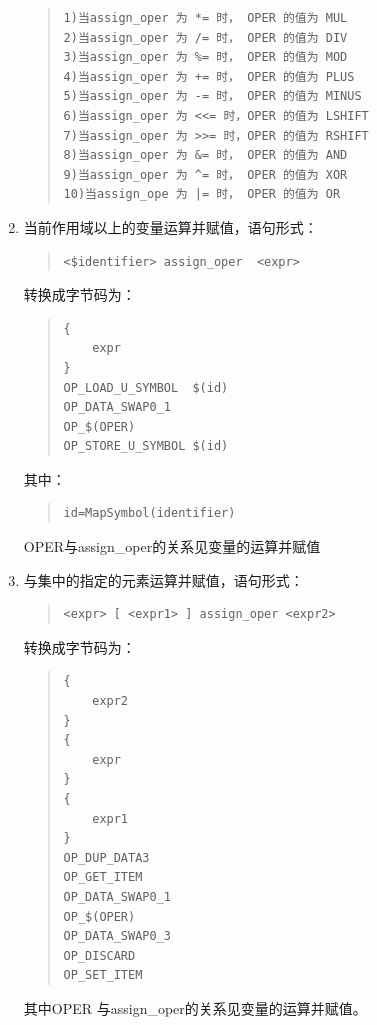 \begin{enumerate}
\begin{quote}
\begin{verbatim}
1)当assign_oper 为 *= 时， OPER 的值为 MUL
2)当assign_oper 为 /= 时， OPER 的值为 DIV 
3)当assign_oper 为 %= 时， OPER 的值为 MOD 
4)当assign_oper 为 += 时， OPER 的值为 PLUS 
5)当assign_oper 为 -= 时， OPER 的值为 MINUS
6)当assign_oper 为 <<= 时，OPER 的值为 LSHIFT
7)当assign_oper 为 >>= 时，OPER 的值为 RSHIFT
8)当assign_oper 为 &= 时， OPER 的值为 AND
9)当assign_oper 为 ^= 时， OPER 的值为 XOR
10)当assign_ope 为 |= 时， OPER 的值为 OR
\end{verbatim}
\end{quote}
\item 当前作用域以上的变量运算并赋值，语句形式：
\begin{quote}
\begin{verbatim}
<$identifier> assign_oper  <expr>
\end{verbatim}
\end{quote}
转换成字节码为：
\begin{quote}
\begin{verbatim}
{
    expr 
}
OP_LOAD_U_SYMBOL  $(id)
OP_DATA_SWAP0_1
OP_$(OPER)
OP_STORE_U_SYMBOL $(id)
\end{verbatim}
\end{quote}
其中：
\begin{quote}
\begin{verbatim}
id=MapSymbol(identifier)
\end{verbatim}
\end{quote}
OPER与assign\_oper的关系见变量的运算并赋值
\item 与集中的指定的元素运算并赋值，语句形式：
\begin{quote}
\begin{verbatim}
<expr> [ <expr1> ] assign_oper <expr2>
\end{verbatim}
\end{quote}
转换成字节码为：
\begin{quote}
\begin{verbatim}
{
    expr2
}
{
    expr 
}
{
    expr1
}
OP_DUP_DATA3
OP_GET_ITEM
OP_DATA_SWAP0_1
OP_$(OPER)
OP_DATA_SWAP0_3
OP_DISCARD
OP_SET_ITEM
\end{verbatim}
\end{quote}
其中OPER 与assign\_oper的关系见变量的运算并赋值。


\end{enumerate}
